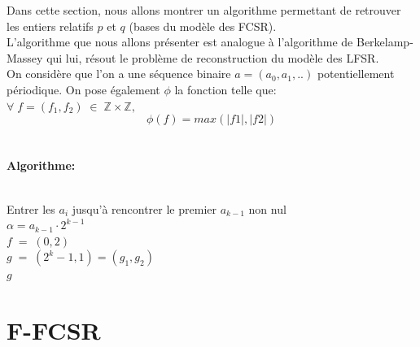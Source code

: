 \documentclass[11pt]{report}
\begin{document}
	Dans cette section, nous allons montrer un algorithme permettant de retrouver les entiers relatifs $p$ et $q$ (bases du modèle des FCSR). 
	 \\
	 L'algorithme que nous allons présenter est analogue à l'algorithme de Berkelamp-Massey qui lui, résout le problème de reconstruction du modèle des LFSR. \\
	 On considère que l'on a une séquence binaire $a = (a_0,a_1,..)$ potentiellement périodique. On pose également $\phi$ la fonction telle que:\\
	 $\forall \; f=(f_1,f_2) \; \in \; \mathbb{Z} \times \mathbb{Z},$\\
	 $$\phi(f)=max(|f1|,|f2|)$$
	 	\\\\
		\textbf{Algorithme:}
		\\\\
	 \begin{algorithm}[H]
	 Entrer les $a_i$ jusqu'à rencontrer le premier $a_{k-1}$ non nul\\
	 $\alpha = a_{k-1} \cdot 2^{k-1}$\\
	 $f \; = \; (0,2)$\\
	 $g \; = \; (2^k-1,1)=(g_1,g_2)$\\
 \Return $g$
  \end{algorithm}
 
\section{F-FCSR}
\end{document}
